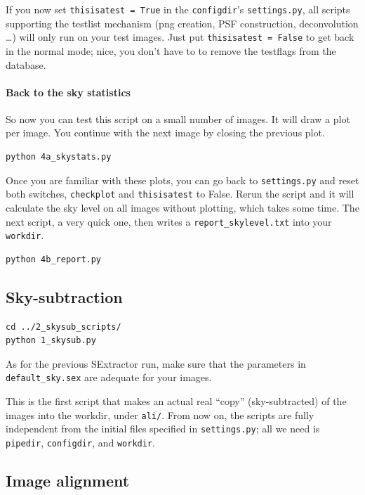 If you now set \verb+thisisatest = True+ in the \verb+configdir+'s \verb+settings.py+, all scripts supporting the testlist mechanism (png creation, PSF construction, deconvolution \ldots) will only run on your test images. Just put  \verb+thisisatest = False+ to get back in the normal mode; nice, you don't have to to remove the testflags from the database.

\paragraph{Back to the sky statistics}

So now you can test this script on a small number of images. It will draw a plot per image. You continue with the next image by closing the previous plot.

\begin{Verbatim}
python 4a_skystats.py 
\end{Verbatim}
Once you are familiar with these plots, you can go back to \verb+settings.py+ and reset both switches, \verb+checkplot+ and \verb+thisisatest+ to False. Rerun the script and it will calculate the sky level on all images without plotting, which takes some time. The next script, a very quick one, then writes a \verb+report_skylevel.txt+ into your \verb+workdir+.

\begin{Verbatim}
python 4b_report.py 
\end{Verbatim}




\subsection{Sky-subtraction}

\begin{Verbatim}
cd ../2_skysub_scripts/
python 1_skysub.py
\end{Verbatim}

As for the previous SExtractor run, make sure that the parameters in \verb+default_sky.sex+ are adequate for your images.

This is the first script that makes an actual real ``copy'' (sky-subtracted) of the images into the workdir, under \verb+ali/+. From now on, the scripts are fully independent from the initial files specified in \verb+settings.py+; all we need is \verb+pipedir+, \verb+configdir+, and \verb+workdir+.


\subsection{Image alignment}


